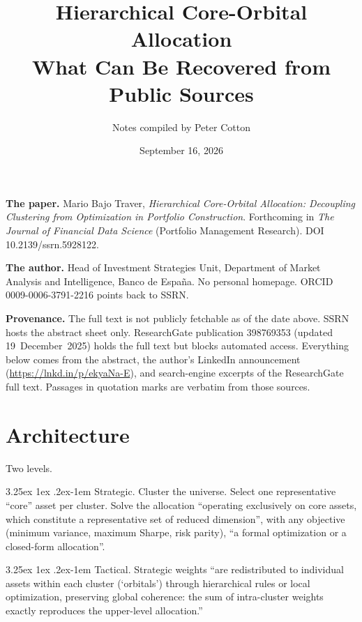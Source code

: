\documentclass[11pt]{article}
\title{Hierarchical Core-Orbital Allocation\\[2pt]
\large What Can Be Recovered from Public Sources}
\author{Notes compiled by Peter Cotton}
\date{September 16, 2026}
\makeatletter
\renewcommand\paragraph{\@startsection{paragraph}{4}{\z@}%
  {3.25ex \@plus1ex \@minus.2ex}{-1em}%
  {\normalfont\normalsize\itshape}}
\makeatother
\begin{document}
\maketitle

\begin{tcolorbox}[colback=gray!6, colframe=gray!50, boxrule=0.4pt, arc=2pt]
\small
\textbf{The paper.} Mario Bajo Traver, \emph{Hierarchical Core-Orbital
Allocation: Decoupling Clustering from Optimization in Portfolio
Construction}. Forthcoming in \emph{The Journal of Financial Data Science}
(Portfolio Management Research). DOI 10.2139/ssrn.5928122.

\medskip
\textbf{The author.} Head of Investment Strategies Unit, Department of
Market Analysis and Intelligence, Banco de Espa\~na. No personal homepage.
ORCID 0009-0006-3791-2216 points back to SSRN.

\medskip
\textbf{Provenance.} The full text is not publicly fetchable as of the date
above. SSRN hosts the abstract sheet only. ResearchGate publication 398769353
(updated 19~December~2025) holds the full text but blocks automated access.
Everything below comes from the abstract, the author's LinkedIn
announcement (\url{https://lnkd.in/p/ekyaNa-E}), and search-engine excerpts
of the ResearchGate full text. Passages in quotation marks are verbatim
from those sources.
\end{tcolorbox}

\section*{Architecture}

Two levels.

\paragraph{Strategic.} Cluster the universe. Select one representative
``core'' asset per cluster. Solve the allocation ``operating exclusively on
core assets, which constitute a representative set of reduced dimension'',
with any objective (minimum variance, maximum Sharpe, risk parity), ``a
formal optimization or a closed-form allocation''.

\paragraph{Tactical.} Strategic weights ``are redistributed to individual
assets within each cluster (`orbitals') through hierarchical rules or local
optimization, preserving global coherence: the sum of intra-cluster weights
exactly reproduces the upper-level allocation.''
\end{document}
